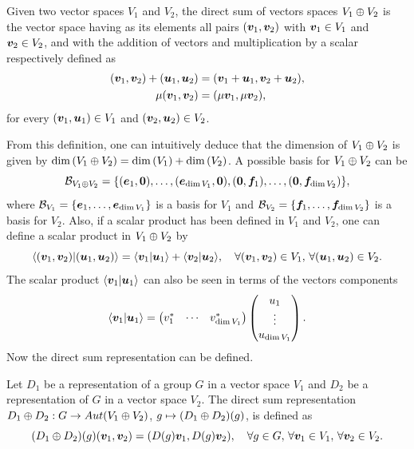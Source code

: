 \begin{defn}
    Given two vector spaces $V_1$ and $V_2$, the direct sum of vectors spaces $V_1 \oplus V_2$ is the vector space having as its elements all pairs $(\bm{v}_1,\bm{v}_2)$ with $\bm{v}_1 \in V_1$ and $\bm{v}_2 \in V_2$, and with the addition of vectors and multiplication by a scalar respectively defined as
    \begin{align}
        (\bm{v}_1,\bm{v}_2) + (\bm{u}_1,\bm{u}_2) &= (\bm{v}_1 + \bm{u}_1, \bm{v}_2 + \bm{u}_2), \\
        \mu(\bm{v}_1,\bm{v}_2) &= (\mu \bm{v}_1, \mu \bm{v}_2),
    \end{align}
    for every $(\bm{v}_1,\bm{u}_1) \in V_1$ and $(\bm{v}_2,\bm{u}_2) \in V_2$.
\end{defn}
From this definition, one can intuitively deduce that the dimension of $V_1 \oplus V_2$ is given by $\dim{(V_1 \oplus V_2)} = \dim{(V_1)} + \dim{(V_2)}$. A possible basis for $V_1 \oplus V_2$ can be 
\begin{equation}
    \mathcal{B}_{V_1 \oplus V_2} = \{(\bm{e}_1,\bm{0}),\dots,(\bm{e}_{\dim{V_1}},\bm{0}),(\bm{0},\bm{f}_1),\dots,(\bm{0},\bm{f}_{\dim{V_2}})\},
\end{equation}
where $\mathcal{B}_{V_1} = \{\bm{e}_1,\dots,\bm{e}_{\dim{V_1}}\}$ is a basis for $V_1$ and $\mathcal{B}_{V_2} = \{\bm{f}_1,\dots,\bm{f}_{\dim{V_2}}\}$ is a basis for $V_2$. Also, if a scalar product has been defined in $V_1$ and $V_2$, one can define a scalar product in $V_1 \oplus V_2$ by 
\begin{equation}
    \langle (\bm{v}_1,\bm{v}_2) | (\bm{u}_1,\bm{u}_2) \rangle = \langle \bm{v}_1 | \bm{u}_1 \rangle + \langle \bm{v}_2 | \bm{u}_2 \rangle,\quad \forall (\bm{v}_1,\bm{v}_2) \in V_1,\,\forall (\bm{u}_1,\bm{u}_2) \in V_2.
\end{equation}
The scalar product $\langle \bm{v}_1 | \bm{u}_1 \rangle$ can also be seen in terms of the vectors components 
\begin{equation}
    \langle \bm{v}_1 | \bm{u}_1 \rangle = 
    \begin{pmatrix}
        v_1^* & \cdots & v_{\dim{V_1}}^*
    \end{pmatrix}
    \begin{pmatrix}
        u_1 \\
        \vdots \\
        u_{\dim{V_1}}
    \end{pmatrix}.
\end{equation}
Now the direct sum representation can be defined.
\begin{defn}
    Let $D_1$ be a representation of a group $G$ in a vector space $V_1$ and $D_2$ be a representation of $G$ in a vector space $V_2$. The direct sum representation $D_1 \oplus D_2 : G \to Aut(V_1 \oplus V_2)$, $g \mapsto (D_1 \oplus D_2)(g)$, is defined as
    \begin{equation}
        (D_1 \oplus D_2)(g)(\bm{v}_1,\bm{v}_2) = (D(g)\bm{v}_1,D(g)\bm{v}_2),\quad \forall g \in G,\,\forall \bm{v}_1 \in V_1,\,\forall \bm{v}_2 \in V_2.
    \end{equation}
\end{defn}
